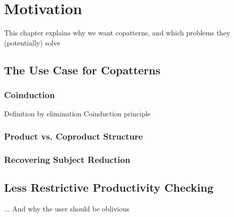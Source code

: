 \chapter{Motivation}
This chapter explains why we want copatterns, and which problems they (potentially) solve

\section{The Use Case for Copatterns}
\label{sec:motivation_copatterns}


\subsection{Coinduction}
Definition by elimination
Coinduction principle

\subsection{Product vs. Coproduct Structure}
\label{sec:prod-vs.-copr}

\subsection{Recovering Subject Reduction}


\section{Less Restrictive Productivity Checking} 


... And why the user should be oblivious

